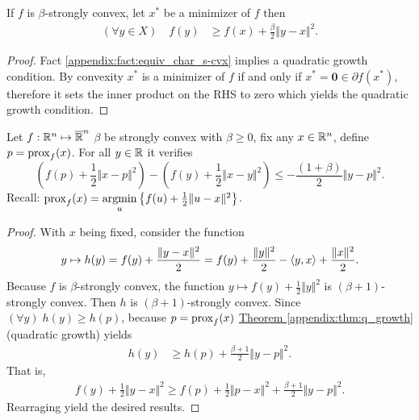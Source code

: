 \documentclass[12pt]{article}
\begin{document}
    \begin{theorem}\label{appendix:thm:q_growth}
        If $f$ is $\beta$-strongly convex, let $x^*$ be a minimizer of $f$ then 
        \begin{align*}
            (\forall y \in X) \quad 
            f(y) &\ge 
            f(x) + \frac{\beta}{2}\Vert y - x\Vert^2. 
        \end{align*}
    \end{theorem}
    \begin{proof}
        Fact \ref*{appendix:fact:equiv_char_s-cvx} 
        implies a quadratic growth condition. 
        By convexity $x^*$ is a minimizer of $f$ if and only if $x^*= \mathbf 0 \in \partial f(x^*)$, therefore it sets the inner product on the RHS to zero which yields the quadratic growth condition. 
    \end{proof}

    \begin{theorem}
    \label{appendix:proof_ppm_descent_lemma}
        Let $f: \mathbb R^n \mapsto \overline {\mathbb R}^n$ $\beta$ be strongly convex with $\beta \ge 0$, fix any $x \in \mathbb R^n$, define $p = \operatorname{prox}_f(x)$.
        For all $y \in \mathbb R$ it verifies
        $$
            \left(f(p) + \frac{1}{2}\Vert x - p\Vert^2\right)
            - 
            \left(
                f(y) + \frac{1}{2}\Vert x - y\Vert^2 
            \right)
            \le 
            - \frac{(1 + \beta)}{2}\Vert y - p\Vert^2. 
        $$
        Recall: $\operatorname{prox}_f(x) = \mathop{\rm argmin}\limits_{u}\left\lbrace f(u) + \frac{1}{2}\Vert u - x\Vert^2 \right\rbrace$. 
    \end{theorem}
    \begin{proof}
        With $x$ being fixed,
        consider the function
        $$
            y\mapsto h(y)=f(y)+\frac{\|y-x\|^2}{2}=f(y)+\frac{\|y\|^2}{2}-\langle{{y},{x}}\rangle+\frac{\|x\|^2}{2}.
        $$
        Because $f$ is $\beta$-strongly convex, the function
        $y\mapsto f(y) + \frac{1}{2}\Vert y\Vert^2$ is $(\beta + 1)$-strongly convex.
        Then $h$ is $(\beta + 1)$-strongly convex.
        Since $(\forall y)\; h(y) \ge h(p)$, because $p = \operatorname{prox}_f(x)$ 
        \hyperref[appendix:thm:q_growth]{Theorem \ref*{appendix:thm:q_growth}}
        (quadratic growth)
        yields
        \begin{align*}
            h(y) &\ge
            h(p) + \frac{\beta + 1}{2}\Vert y - p\Vert^2.
        \end{align*}
        That is,
        \begin{align*}
            f(y) + \frac{1}{2}\Vert y - x\Vert^2
            \ge
            f(p) + \frac{1}{2} \Vert p - x\Vert^2
            + \frac{\beta + 1}{2}\Vert y - p\Vert^2.
        \end{align*}
        Rearraging yield the desired results. 
    \end{proof}





\end{document}
